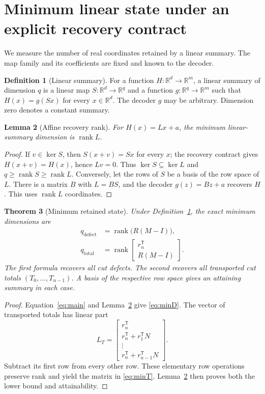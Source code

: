 \documentclass[11pt,a4paper]{article}
\newtheorem{theorem}{Theorem}\newtheorem{proposition}[theorem]{Proposition}\newtheorem{lemma}[theorem]{Lemma}\newtheorem{corollary}[theorem]{Corollary}
\theoremstyle{definition}\newtheorem{definition}[theorem]{Definition}\newtheorem{example}[theorem]{Example}\newtheorem{remark}[theorem]{Remark}
\DeclareMathOperator{\rank}{rank}\DeclareMathOperator{\im}{im}\DeclareMathOperator{\spanop}{span}\DeclareMathOperator{\diag}{diag}
\newcommand{\R}{\mathbb R}\newcommand{\Q}{\mathbb Q}\newcommand{\Z}{\mathbb Z}\newcommand{\N}{\mathbb N}\newcommand{\id}{\mathrm{id}}
\begin{document}
\section{Minimum linear state under an explicit recovery contract}
We measure the number of real coordinates retained by a linear summary.
The map family and its coefficients are fixed and known to the decoder.

\begin{definition}[Linear summary]\label{def:summary}
For a function $H:\R^d\to\R^m$, a linear summary of dimension $q$ is
a linear map $S:\R^d\to\R^q$ and a function
$g:\R^q\to\R^m$ such that $H(x)=g(Sx)$ for every $x\in\R^d$.
The decoder $g$ may be arbitrary. Dimension zero denotes a constant
summary.
\end{definition}

\begin{lemma}[Affine recovery rank]\label{lem:rank}
For $H(x)=Lx+a$, the minimum linear-summary dimension is $\rank L$.
\end{lemma}
\begin{proof}
If $v\in\ker S$, then $S(x+v)=Sx$ for every $x$; the recovery
contract gives $H(x+v)=H(x)$, hence $Lv=0$. Thus
$\ker S\subseteq\ker L$ and $q\ge\rank S\ge\rank L$.
Conversely, let the rows of $S$ be a basis of the row space of $L$.
There is a matrix $B$ with $L=BS$, and the decoder
$g(z)=Bz+a$ recovers $H$. This uses $\rank L$ coordinates.
\end{proof}

\begin{theorem}[Minimum retained state]\label{thm:minimal}
Under Definition~\ref{def:summary}, the exact minimum dimensions are
\begin{align}
 q_{\mathrm{defect}}&=\rank\bigl(R(M-I)\bigr),\label{eq:minD}\\
 q_{\mathrm{total}}&=\rank\begin{bmatrix}r_n^{\mathsf T}\\R(M-I)\end{bmatrix}.
 \label{eq:minT}
\end{align}
The first formula recovers all cut defects. The second recovers all
transported cut totals $(T_0,\ldots,T_{n-1})$. A basis of the respective
row space gives an attaining summary in each case.
\end{theorem}
\begin{proof}
Equation~\eqref{eq:main} and Lemma~\ref{lem:rank} give
\eqref{eq:minD}. The vector of transported totals has linear part
\[
 L_T=\begin{bmatrix}
 r_n^{\mathsf T}\\
 r_n^{\mathsf T}+r_1^{\mathsf T}N\\
 \vdots\\
 r_n^{\mathsf T}+r_{n-1}^{\mathsf T}N
 \end{bmatrix}.
\]
Subtract its first row from every other row. These elementary row
operations preserve rank and yield the matrix in \eqref{eq:minT}.
Lemma~\ref{lem:rank} then proves both the lower bound and attainability.
\end{proof}
\end{document}
